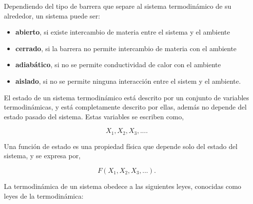 \documentclass[letterpaper,12pt,oneside]{book}
\begin{document}
	Dependiendo del tipo de barrera que separe al sistema termodin\'amico de su alrededor, un sistema puede ser:
	
	\begin{itemize}
		\item \textbf{abierto}, si existe intercambio de materia entre el sistema y el ambiente
		
		\item \textbf{cerrado}, si la barrera no permite intercambio de materia con el ambiente
		
		\item \textbf{adiab\'atico}, si no se permite conductividad de calor con el ambiente
		
		\item \textbf{aislado}, si no se permite ninguna interacci\'on entre el sistem y el ambiente.
	\end{itemize}

	El estado de un sistema termodin\'amico est\'a descrito por un conjunto de variables termodin\'amicas, y est\'a completamente descrito por ellas, adem\'as no depende del estado pasado del sistema. Estas variables se escriben como,
	
	\begin{equation}
		{X_1, X_2, X_3, ... }.
	\end{equation}
	
	Una funci\'on de estado es una propiedad f\'isica que depende solo del estado del sistema, y se expresa por, 
	
	\begin{equation}
		F(X_1, X_2, X_3, ...).
	\end{equation}
	
	La termodin\'amica de un sistema obedece a las siguientes leyes, conocidas como leyes de la termodin\'amica:
	
\end{document}

